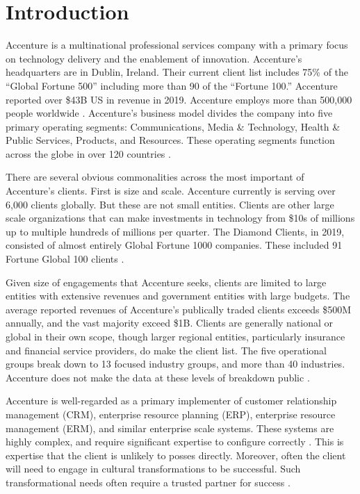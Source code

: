 \section{Introduction}

Accenture is a multinational professional services company with a primary focus on
technology delivery and the enablement of innovation. Accenture’s headquarters are in
Dublin, Ireland. Their current client list includes 75\% of the “Global Fortune 500”
including more than 90 of the “Fortune 100.” Accenture reported over \$43B US in revenue
in 2019. Accenture employs more than 500,000 people worldwide \parencite{AccenturePLC2019}. Accenture’s business model divides the company into five primary operating
segments: Communications, Media \& Technology, Health \& Public Services, Products, and
Resources. These operating segments function across the globe in over 120 countries \parencite{wagleSWOTAnalysisAccenture2020}.

There are several obvious commonalities across the most important of Accenture’s
clients. First is size and scale. Accenture currently is serving over 6,000 clients globally.
But these are not small entities. Clients are other large scale organizations that can make
investments in technology from \$10s of millions up to multiple hundreds of millions per
quarter. The Diamond Clients, in 2019, consisted of almost entirely Global Fortune 1000
companies. These included 91 Fortune Global 100 clients \parencite{wagleClientAnalysisAccenture2020}.

Given size of engagements that Accenture seeks, clients are limited to large entities
with extensive revenues and government entities with large budgets. The average reported
revenues of Accenture’s publically traded clients exceeds \$500M annually, and the vast
majority exceed \$1B. Clients are generally national or global in their own scope, though
larger regional entities, particularly insurance and financial service providers, do make the
client list. The five operational groups break down to 13 focused industry groups, and more
than 40 industries. Accenture does not make the data at these levels of breakdown public \parencite{wagleEvaluationFinancialStatus2020}.

Accenture is well-regarded as a primary implementer of customer relationship
management (CRM), enterprise resource planning (ERP), enterprise resource
management (ERM), and similar enterprise scale systems. These systems are highly
complex, and require significant expertise to configure correctly \parencite{aboabdoImplementingEnterpriseResource2019}. This is expertise that the client is unlikely to posses directly. Moreover, often the client will need to engage in cultural transformations to be successful. Such transformational needs often require a trusted partner for success \parencite{kimpelMeasuringImpactCulture2020}.

